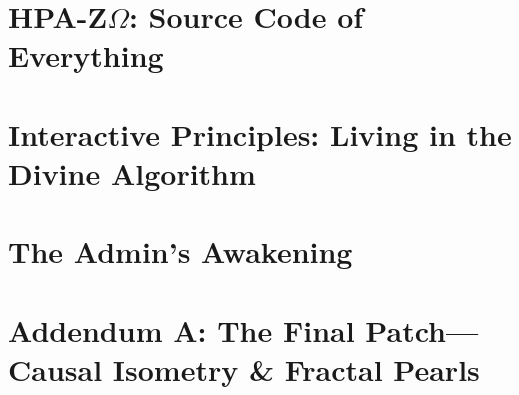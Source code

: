 \documentclass[11pt,a4paper,twoside]{book}
\begin{document}
\chapter{\texorpdfstring{HPA-Z$\Omega$}{HPA-ZΩ}: Source Code of Everything}





\chapter{Interactive Principles: Living in the Divine Algorithm}





\chapter*{The Admin's Awakening}




\chapter*{Addendum A: The Final Patch---Causal Isometry \& Fractal Pearls}


\appendix
\end{document}
